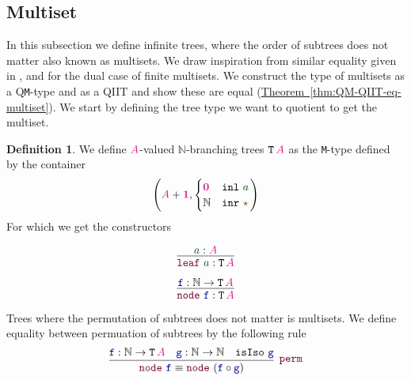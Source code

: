 \documentclass[twoside,11pt,openright]{report}
\theoremstyle{plain} %
\theoremstyle{definition}
\newtheorem{defn}[thm]{Definition}%
\theoremstyle{remark}
\newcommand*{\thmref}[1]{\hyperref[thm:#1]{Theorem~\ref*{thm:#1}}} %
\newcommand*{\term}[1]{\textcolor{green!30!black}{#1}} %
\newcommand*{\type}[1]{\textcolor{magenta!90!black}{#1}}
\newcommand*{\unit}{\type{\textbf{1}}}
\newcommand*{\empt}{\type{\textbf{0}}}
\newcommand*{\constant}[1]{\textcolor{orange!60!black}{\ensuremath{\mathtt{#1}}}}
\newcommand*{\function}[1]{\textcolor{blue!60!black}{\ensuremath{\mathtt{#1}}}}
\newcommand*{\constructor}[1]{\textcolor{purple!60!black}{\ensuremath{\mathtt{#1}}}}
\newcommand*{\typeformer}[1]{\ensuremath{\mathtt{#1}}}
\newcommand*{\unitelem}{\constant{\star}} %
\begin{document}
\subsection{Multiset}
In this subsection we define infinite trees, where the order of subtrees does not matter also known as multisets. We draw inspiration from similar equality given in \cite{DBLP:QIIT}, \cite{DBLP:tt-in-tt} and \cite{DBLP:Constructing-QIITs} for the dual case of finite multisets. We construct the type of multisets as a Q\texttt{M}-type and as a QIIT and show these are equal (\thmref{QM-QIIT-eq-multiset}). We start by defining the tree type we want to quotient to get the multiset.
\begin{defn}
  We define \(\type{A}\)-valued \(\mathbb{N}\)-branching trees \(\typeformer{T}\,\type{A}\) as the \texttt{M}-type defined by the container
  \begin{equation}
    \left(\type{A}+\unit, \begin{cases} \empt & \mathtt{inl}~\term{a} \\ \mathbb{N} & \mathtt{inr}~\unitelem \end{cases}\right)
  \end{equation}
  For which we get the constructors\\[-10mm]
  \begin{center}
    \strut
    \hfill
    \begin{minipage}[b]{0.25\linewidth}
      \begin{equation}
        \vcenter{\infer{\constructor{leaf}~\term{a} : \typeformer{T}\,\type{A}}{\term{a} : \type{A}}}
      \end{equation}
    \end{minipage}
    \hfill
    \begin{minipage}[b]{0.25\linewidth}
      \begin{equation}
        \vcenter{\infer{\constructor{node}~\function{f} : \typeformer{T}\,\type{A}}{\function{f} : \mathbb{N} \rightarrow \typeformer{T}\,\type{A}}}
      \end{equation}
    \end{minipage}
    \hfill
    \strut
  \end{center}
\end{defn}
\noindent Trees where the permutation of subtrees does not matter is multisets. We define equality between permuation of subtrees by the following rule
\begin{equation}
  \vcenter{\infer[\constructor{perm}]{\constructor{node}~\function{f} \equiv \constructor{node}~(\function{f} \circ \function{g})}{\function{f} : \mathbb{N} \rightarrow \typeformer{T}\,\type{A} & \function{g} : \mathbb{N} \rightarrow \mathbb{N} & \mathtt{isIso}~\function{g}}}
\end{equation}
\end{document}
